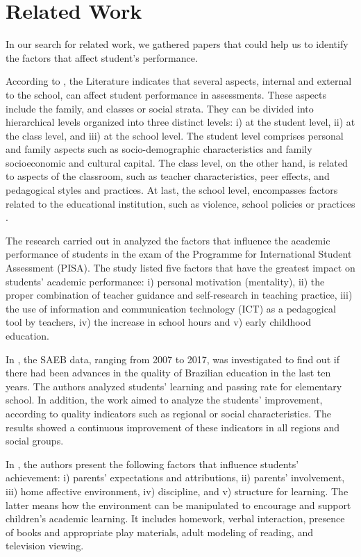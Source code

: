 \documentclass[12pt]{article}
\begin{document}
\section{Related Work}\label{related}

In our search for related work, we gathered papers that could help us to identify the factors that affect student's performance. 


According to \cite{Lopes2020}, the Literature indicates that several aspects, internal and external to the school, can affect student performance in assessments. These aspects include the family, and classes or social strata. They can be divided into hierarchical levels organized into three distinct levels: i) at the student level, ii) at the class level, and iii) at the school level. The student level comprises personal and family aspects such as socio-demographic characteristics and family socioeconomic and cultural capital. The class level, on the other hand, is related to aspects of the classroom, such as teacher characteristics, peer effects, and pedagogical styles and practices. At last, the school level, encompasses factors related to the educational institution, such as violence, school policies or practices \cite{Lopes2020}.

The research carried out in \cite{chaia2017drives} analyzed the factors that influence the academic performance of students in the exam of the Programme for International Student Assessment (PISA). The study listed five factors that have the greatest impact on students' academic performance: i) personal motivation (mentality), ii) the proper combination of teacher guidance and self-research in teaching practice, iii) the use of information and communication technology (ICT) as a pedagogical tool by teachers, iv) the increase in school hours and v) early childhood education.

In \cite{alves2019decada}, the SAEB data, ranging from 2007 to 2017, was investigated to find out if there had been advances in the quality of Brazilian education in the last ten years. The authors analyzed students' learning and passing rate for elementary school. In addition, the work aimed to analyze the students' improvement, according to quality indicators such as regional or social characteristics. The results showed a continuous improvement of these indicators in all regions and social groups.

In \cite{Christenson_1992}, the authors present the following factors that influence students' achievement: i) parents' expectations and attributions, ii) parents' involvement,  iii) home affective environment, iv) discipline, and v) structure for learning. The latter means how the environment can be manipulated to encourage and support children’s academic learning. It includes homework, verbal interaction, presence of books and appropriate play materials, adult modeling of reading, and television viewing.
\end{document}
